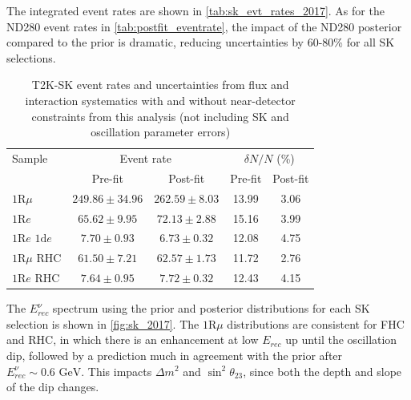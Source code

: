 The integrated event rates are shown in \autoref{tab:sk_evt_rates_2017}. As for the ND280 event rates in \autoref{tab:postfit_eventrate}, the impact of the ND280 posterior compared to the prior is dramatic, reducing uncertainties by 60-80\% for all SK selections.
\begin{table}[h]
	\begin{tabular}{l | c c | c c}
		\hline
		\hline
		Sample & \multicolumn{2}{c|}{Event rate} & \multicolumn{2}{c}{$\delta N/N$ (\%)} \\
		& Pre-fit & Post-fit & Pre-fit & Post-fit \\
		\hline
		$1\text{R}\mu$ & $249.86\pm34.96$ & $262.59\pm8.03$ & 13.99 & 3.06 \\
		$1\text{R}e$ & $65.62\pm9.95$ & $72.13\pm2.88$ & 15.16 &  3.99   \\
		$1\text{R}e \text{ 1d}e$ & $7.70\pm0.93$ & $6.73\pm0.32$ & 12.08 & 4.75  \\
		
		$1\text{R}\mu \text{ RHC}$ & $61.50\pm7.21$ & $62.57\pm1.73$ & 11.72 & 2.76 \\
		$1\text{R}e \text{ RHC}$ & $7.64\pm0.95$ & $7.72\pm0.32$ & 12.43 & 4.15  \\
		\hline
		\hline
	\end{tabular}
\caption{T2K-SK event rates and uncertainties from flux and interaction systematics with and without near-detector constraints from this analysis (not including SK and oscillation parameter errors)}
\label{tab:sk_evt_rates_2017}
\end{table}

The $E^\nu_{rec}$ spectrum using the prior and posterior distributions for each SK selection is shown in \autoref{fig:sk_2017}. The $1\text{R}\mu$ distributions are consistent for FHC and RHC, in which there is an enhancement at low $E_{rec}$ up until the oscillation dip, followed by a prediction much in agreement with the prior after $E^\nu_{rec}\sim0.6\text{ GeV}$. This impacts $\Delta m^2$ and $\sin^2\theta_{23}$, since both the depth and slope of the dip changes. 


